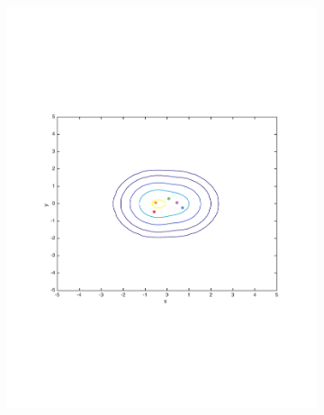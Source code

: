 \documentclass[preprint, 12pt]{elsarticle}
\begin{document}
\begin{figure}[htp!]
	\begin{subfigure}[t]{0.485\textwidth}
		\includegraphics[width=\textwidth, trim={15mm 85mm 20mm 75mm}]{Graphics/contour_mu05_nratio2.pdf}
		\caption{}
		\label{fig:contour_mu05}
	\end{subfigure}
	~
	\begin{subfigure}[t]{0.485\textwidth}

\end{subfigure}
\end{figure}
\end{document}
